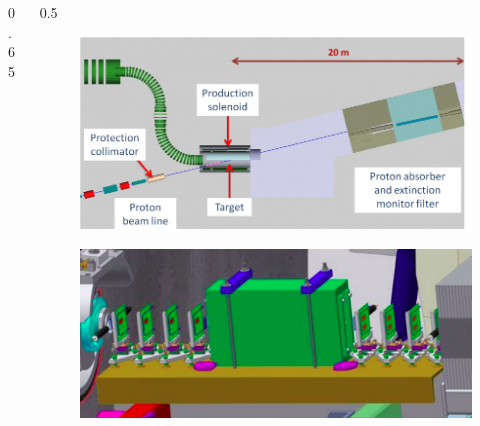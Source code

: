 \documentclass{beamer}
\begin{document}
\begin{frame}
\begin{columns}
\begin{column}{0.65\framewidth}
\begin{itemize}
              
               \end{itemize}
            \end{column}
            \begin{column}{0.5\framewidth}
                \begin{figure}[!h]
                    \centering
                    \includegraphics[width =\columnwidth]{figures/png/800px-Extinction_filter.png}
                    \label{fig:extintion}
                    \end{figure}
                    \begin{figure}[!h]
                    \centering
                    \includegraphics[width =\columnwidth]{figures/png/Screenshot_20240306_184720.png}
                    \label{fig:extintionmonitor}
                    \end{figure}
            \end{column}
    \end{columns}
\end{frame}
\end{document}
